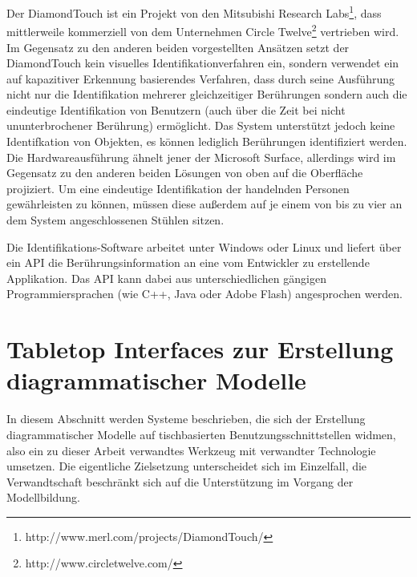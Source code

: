 Der DiamondTouch \citep{Dietz01} ist ein Projekt von den Mitsubishi Research Labs\footnote{http://www.merl.com/projects/DiamondTouch/}, dass mittlerweile kommerziell von dem Unternehmen Circle Twelve\footnote{http://www.circletwelve.com/} vertrieben wird. Im Gegensatz zu den anderen beiden vorgestellten Ansätzen setzt der DiamondTouch kein visuelles Identifikationverfahren ein, sondern verwendet ein auf kapazitiver Erkennung basierendes Verfahren, dass durch seine Ausführung nicht nur die Identifikation mehrerer gleichzeitiger Berührungen sondern auch die eindeutige Identifikation von Benutzern (auch über die Zeit bei nicht ununterbrochener Berührung) ermöglicht. Das System unterstützt jedoch keine Identifkation von Objekten, es können lediglich Berührungen identifiziert werden. Die Hardwareausführung ähnelt jener der Microsoft Surface, allerdings wird im Gegensatz zu den anderen beiden Lösungen von oben auf die Oberfläche projiziert. Um eine eindeutige Identifikation der handelnden Personen gewährleisten zu können, müssen diese außerdem auf je einem von bis zu vier an dem System angeschlossenen Stühlen sitzen.

Die Identifikations-Software arbeitet unter Windows oder Linux und liefert über ein \gls{API} die Berührungsinformation an eine vom Entwickler zu erstellende Applikation. Das \gls{API} kann dabei aus unterschiedlichen gängigen Programmiersprachen (wie C++, Java oder Adobe Flash) angesprochen werden.


\section{Tabletop Interfaces zur Erstellung diagrammatischer Modelle} %
\label{sub:tangible_interfaces_zur_modellbildung}

In diesem Abschnitt werden Systeme beschrieben, die sich der Erstellung diagrammatischer Modelle auf tischbasierten Benutzungsschnittstellen widmen, also ein zu dieser Arbeit verwandtes Werkzeug mit verwandter Technologie umsetzen. Die eigentliche Zielsetzung unterscheidet sich im Einzelfall, die Verwandtschaft beschränkt sich auf die Unterstützung im Vorgang der Modellbildung.

